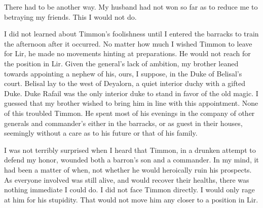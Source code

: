 \documentclass{article}
\begin{document}
There had to be another way. My husband had not won so far as to reduce me to betraying my friends. This I would not do.

\vspace{vspace .5cm}

\begin{comment}
He would not reach for the position in Lir. My brother eaned towards giving the position to a nephew of his, ours, I suppose, in the Duke of Belisal's court. Belisal lay to the west of Deyalorn, a quiet interior duchy with a gifted Duke. Duke Rafail was the only interior duke to stand in favor of the old magic. My brother wished to bring him in line with this appointment.

 "He is not a man who does well with nothing to do," Sophia observed with a hint of sadness. "He has had nothing to do since he came back from Niev."

She was quite likely right about her husband, though I knew there to be another reason for his sudden lack of ambition. Whatever Sophia's, or my, plans for Timmon's future, the Destroyer, or whatever god Timmon now held with, seemed to have plans of his own. 
\end{comment}

I did not learned about Timmon's foolishness until I entered the barracks to train the afternoon after it occurred. No matter how much I wished Timmon to leave for Lir, he made no movements hinting at preparations. He would not reach for the position in Lir. Given the general's lack of ambition, my brother leaned towards appointing a nephew of his, ours, I suppose, in the Duke of Belisal's court. Belisal lay to the west of Deyalorn, a quiet interior duchy with a gifted Duke. Duke Rafail was the only interior duke to stand in favor of the old magic. I guessed that my brother wished to bring him in line with this appointment. None of this troubled Timmon. He spent most of his evenings in the company of other generals and commander's either in the barracks, or as guest in their houses, seemingly without a care as to his future or that of his family.

I was not terribly surprised when I heard that Timmon, in a drunken attempt to defend my honor, wounded both a barron's son and a commander. In my mind, it had been a matter of when, not whether he would heroically ruin his prospects. As everyone involved was still alive, and would recover their healths, there was nothing immediate I could do. I did not face Timmon directly. I would only rage at him for his stupidity. That would not move him any closer to a position in Lir.
\end{document}
